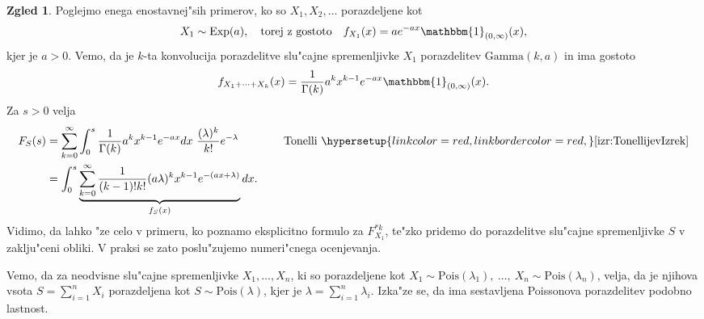 \documentclass[12pt, a4paper, reqno]{amsart}
\theoremstyle{definition}
\newtheorem{zgled}[definicija]{Zgled}
\theoremstyle{plain}
\newcommand{\1}{\mathds{1}}
\newcommand{\Pois}[1]{\text{Pois}(#1)}
\newcommand*{\refPriloga}[1]{%
  \begingroup
    \hypersetup{
      linkcolor=red,
      linkbordercolor=red,
    }%
    \ref{#1}%
  \endgroup
}
\begin{document}
    \begin{zgled}
        Poglejmo enega enostavnej"sih primerov, ko so $X_1, X_2, \dots$ porazdeljene kot
        \begin{equation*}
            X_1\sim\text{Exp}(a),\quad \text{torej z gostoto} \quad  f_{X_1}(x) = a e^{-a x}\mathbbm{1}_{(0, \infty)}(x),
        \end{equation*}
        kjer je $a>0$. Vemo, da je $k$-ta 
        konvolucija porazdelitve slu"cajne spremenljivke $X_1$ porazdelitev
         $\text{Gamma}(k, a)$ in ima gostoto
        \begin{equation*}
            f_{X_1 + \cdots + X_k}(x) = \frac{1}{\Gamma(k)}a^kx^{k-1}e^{-a x}\mathbbm{1}_{(0, \infty)}(x).
        \end{equation*}
        Za $s>0$ velja
        \begin{align*}
            F_{S}(s) 
            &= \sum_{k=0}^\infty \int_0^s\frac{1}{\Gamma(k)}a^kx^{k-1}e^{-ax}dx \ \frac{(\lambda )^k}{k!}e^{-\lambda }
            \qquad \qquad \text{Tonelli} \ \refPriloga{izr:TonellijevIzrek} \\
            &= \int_0^s\underbrace{\sum_{k=0}^\infty \frac{1}{(k-1)!k!}(a\lambda)^kx^{k-1}e^{-(ax + \lambda)}}_{f_S(x)}dx.
        \end{align*}
        Vidimo, da lahko "ze celo v primeru, ko poznamo eksplicitno formulo za $F^{*k}_{X_1}$, te"zko pridemo do 
        porazdelitve slu"cajne spremenljivke $S$ v zaklju"ceni obliki. V praksi se zato poslu"zujemo numeri"cnega 
        ocenjevanja.
        \label{zgd:sestavljenaPoissonovaPorazdelitevGamma}
    \end{zgled}

    Vemo, da za neodvisne slu"cajne spremenljivke $X_1,  \dots, X_n$, ki so porazdeljene 
    kot $X_1\sim\Pois{\lambda_1}, \ \dots, \ X_n\sim\Pois{\lambda_n}$, 
    velja, da je njihova vsota $S = \sum_{i=1}^nX_i$ porazdeljena kot $S\sim\Pois{\lambda}$, kjer je
    $\lambda = \sum_{i=1}^n\lambda_i$.
    Izka"ze se, da ima sestavljena Poissonova porazdelitev 
    podobno lastnost.
\end{document}
